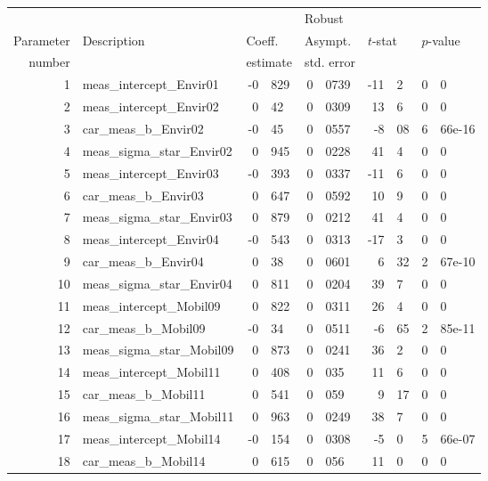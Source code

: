 \documentclass[12pt,a4paper]{article}
\begin{document}
\begin{table}[htb]
    \footnotesize
  \begin{center}
\begin{tabular}{rlr@{.}lr@{.}lr@{.}lr@{.}l}
  &              &   \multicolumn{2}{l}{}         & \multicolumn{2}{l}{Robust}  &  \multicolumn{4}{l}{}  \\
  Parameter & Description & \multicolumn{2}{l}{Coeff.} & \multicolumn{2}{l}{Asympt.} & \multicolumn{2}{l}{$t$-stat} & \multicolumn{2}{l}{$p$-value} \\
  number    &             & \multicolumn{2}{l}{estimate} & \multicolumn{2}{l}{std. error} & \multicolumn{2}{l}{} & \multicolumn{2}{l}{} \\
  \hline
1 & meas\_intercept\_Envir01 & -0&829 & 0&0739 & -11&2 & 0&0 \\ 
2 & meas\_intercept\_Envir02 & 0&42 & 0&0309 & 13&6 & 0&0 \\ 
3 & car\_meas\_b\_Envir02 & -0&45 & 0&0557 & -8&08 & 6&66e-16 \\ 
4 & meas\_sigma\_star\_Envir02 & 0&945 & 0&0228 & 41&4 & 0&0 \\ 
5 & meas\_intercept\_Envir03 & -0&393 & 0&0337 & -11&6 & 0&0 \\ 
6 & car\_meas\_b\_Envir03 & 0&647 & 0&0592 & 10&9 & 0&0 \\ 
7 & meas\_sigma\_star\_Envir03 & 0&879 & 0&0212 & 41&4 & 0&0 \\ 
8 & meas\_intercept\_Envir04 & -0&543 & 0&0313 & -17&3 & 0&0 \\ 
9 & car\_meas\_b\_Envir04 & 0&38 & 0&0601 & 6&32 & 2&67e-10 \\ 
10 & meas\_sigma\_star\_Envir04 & 0&811 & 0&0204 & 39&7 & 0&0 \\ 
11 & meas\_intercept\_Mobil09 & 0&822 & 0&0311 & 26&4 & 0&0 \\ 
12 & car\_meas\_b\_Mobil09 & -0&34 & 0&0511 & -6&65 & 2&85e-11 \\ 
13 & meas\_sigma\_star\_Mobil09 & 0&873 & 0&0241 & 36&2 & 0&0 \\ 
14 & meas\_intercept\_Mobil11 & 0&408 & 0&035 & 11&6 & 0&0 \\ 
15 & car\_meas\_b\_Mobil11 & 0&541 & 0&059 & 9&17 & 0&0 \\ 
16 & meas\_sigma\_star\_Mobil11 & 0&963 & 0&0249 & 38&7 & 0&0 \\ 
17 & meas\_intercept\_Mobil14 & -0&154 & 0&0308 & -5&0 & 5&66e-07 \\ 
18 & car\_meas\_b\_Mobil14 & 0&615 & 0&056 & 11&0 & 0&0 \\ 

\end{tabular}
\end{center}
\end{table}
\end{document}
